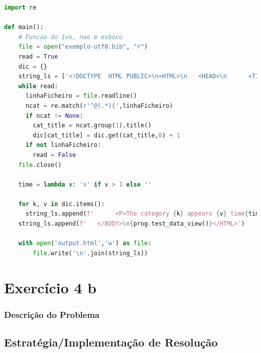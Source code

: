\documentclass[11pt,a4paper]{report}
\begin{document}
\begin{lstlisting}[language=python]
import re

def main():
    # Funcao do Ivo, nao e esboco
    file = open("exemplo-utf8.bib", "r")
    read = True
    dic = {}
    string_ls = ['<!DOCTYPE  HTML PUBLIC>\n<HTML>\n   <HEAD>\n      <TITLE>Categories in BibTeX</TITLE>\n <script type="text/x-mathjax-config"> MathJax.Hub.Config({"extensions":["tex2jax.js"],"jax":["input/TeX","output/HTML-CSS"],"messageStyle":"none","tex2jax":{"processEnvironments":false,"processEscapes":true,"inlineMath":[["$","$"],["\\(","\\)"]],"displayMath":[["$$","$$"],["\\[","\\]"]]},"TeX":{"extensions":["AMSmath.js","AMSsymbols.js","noErrors.js","noUndefined.js"]},"HTML-CSS":{"availableFonts":["TeX"]}}); </script> <script type="text/javascript" async src="file:////home/useralef/.vscode/extensions/shd101wyy.markdown-preview-enhanced-0.6.1/node_modules/@shd101wyy/mume/dependencies/mathjax/MathJax.js" charset="UTF-8"></script>  </HEAD>\n   <BODY>']
    while read:
      linhaFicheiro = file.readline()
      ncat = re.match(r'^@(.*){',linhaFicheiro)
      if ncat != None:
        cat_title = ncat.group(1).title()
        dic[cat_title] = dic.get(cat_title,0) + 1
      if not linhaFicheiro:
        read = False
    file.close()

    time = lambda v: 's' if v > 1 else ''

    for k, v in dic.items():
      string_ls.append(f'      <P>The category {k} appears {v} time{time(v)}.</P>')
    string_ls.append(f'   </BODY>\n{prog.test_data_view()}</HTML>')

    with open('output.html','w') as file:
        file.write('\n'.join(string_ls))
\end{lstlisting}

\chapter{Exercício 4 b}

\subsection{Descrição do Problema}


\section{Estratégia/Implementação de Resolução}
\end{document}

